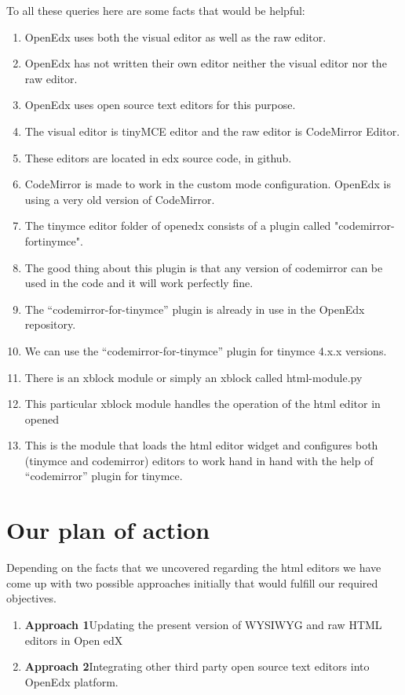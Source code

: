 To all these queries here are some facts that would be helpful:
\begin{enumerate}
\item OpenEdx uses both the visual editor as well as the raw editor.
\item OpenEdx has not written their own editor neither the visual editor nor the raw editor.
\item OpenEdx uses open source text editors for this purpose.
\item The visual editor is tinyMCE editor and the raw editor is CodeMirror Editor.
\item These editors are located in edx source code, in github.
\item CodeMirror is made to work in the custom mode configuration. OpenEdx is using a very old version of CodeMirror.
\item The tinymce editor folder of openedx consists of a plugin called "codemirror-fortinymce".
\item The good thing about this plugin is that any version of codemirror can be used in the code and it will work perfectly fine.
\item The “codemirror-for-tinymce” plugin is already in use in the OpenEdx repository.
\item We can use the “codemirror-for-tinymce” plugin for tinymce 4.x.x versions.
\item There is an xblock module or simply an xblock called html-module.py
\item This particular xblock module handles the operation of the html editor in opened
\item This is the module that loads the html editor widget and configures both (tinymce and codemirror) editors to work hand in hand with the help of “codemirror” plugin for tinymce.
\end{enumerate}


\section{Our plan of action}

Depending on the facts that we uncovered regarding the html editors we have come up with
two possible approaches initially that would fulfill our required objectives.
\begin{enumerate}

\item\textbf{Approach 1}\newline Updating the present version of WYSIWYG and raw HTML editors in Open
edX
\item\textbf{Approach 2}\newline Integrating other third party open source text editors into OpenEdx platform.
\end{enumerate}

